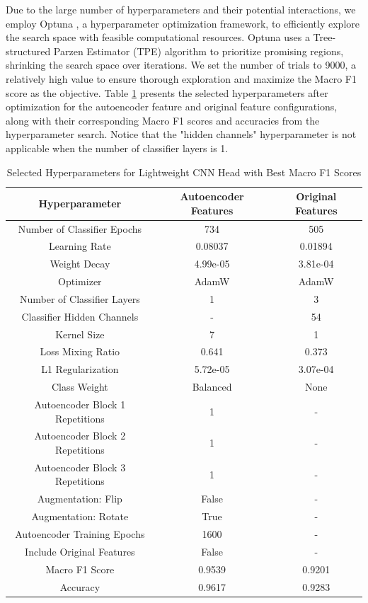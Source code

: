 \documentclass[10pt,letterpaper]{article}
\begin{document}
Due to the large number of hyperparameters and their potential interactions, we employ Optuna \cite{optuna_2019}, a hyperparameter optimization framework, to efficiently explore the search space with feasible computational resources. Optuna uses a Tree-structured Parzen Estimator (TPE) algorithm to prioritize promising regions, shrinking the search space over iterations. We set the number of trials to 9000, a relatively high value to ensure thorough exploration and maximize the Macro F1 score as the objective. Table \ref{tab:selected_hyperparams} presents the selected hyperparameters after optimization for the autoencoder feature and original feature configurations, along with their corresponding Macro F1 scores and accuracies from the hyperparameter search. Notice that the "hidden channels" hyperparameter is not applicable when the number of classifier layers is 1.

\begin{table}[ht]
    \centering
    \caption{Selected Hyperparameters for Lightweight CNN Head with Best Macro F1 Scores}
    \label{tab:selected_hyperparams}
    \begin{tabular}{ccc}
    \hline
    \textbf{Hyperparameter} & \textbf{Autoencoder Features} & \textbf{Original Features} \\
    \hline
    Number of Classifier Epochs & 734 & 505 \\
    Learning Rate & 0.08037 & 0.01894 \\
    Weight Decay & 4.99e-05 & 3.81e-04 \\
    Optimizer & AdamW & AdamW \\
    Number of Classifier Layers & 1 & 3 \\
    Classifier Hidden Channels & - & 54 \\
    Kernel Size & 7 & 1 \\
    Loss Mixing Ratio & 0.641 & 0.373 \\
    L1 Regularization & 5.72e-05 & 3.07e-04 \\
    Class Weight & Balanced & None \\
    Autoencoder Block 1 Repetitions & 1 & - \\
    Autoencoder Block 2 Repetitions & 1 & - \\
    Autoencoder Block 3 Repetitions & 1 & - \\
    Augmentation: Flip & False & - \\
    Augmentation: Rotate & True & - \\
    Autoencoder Training Epochs & 1600 & - \\
    Include Original Features & False & - \\
    \hline
    Macro F1 Score & 0.9539 & 0.9201 \\
    Accuracy & 0.9617 & 0.9283 \\
    \hline
    \end{tabular}
\end{table}
\end{document}
